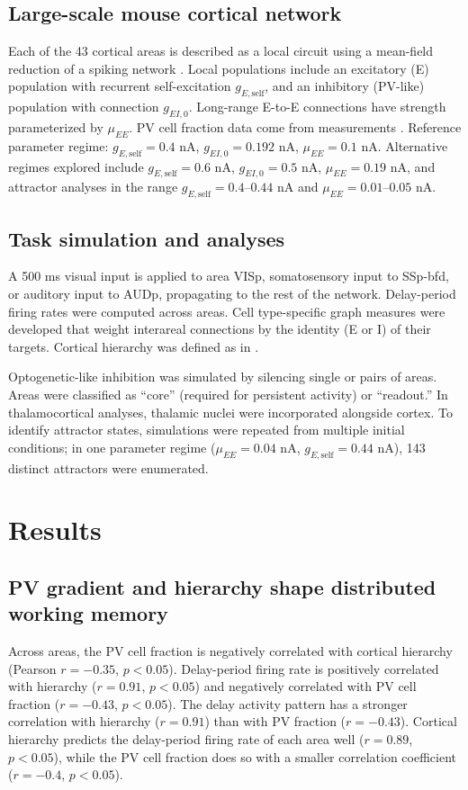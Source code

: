 \documentclass[11pt]{article}
\begin{document}
\subsection{Large-scale mouse cortical network}
Each of the 43 cortical areas is described as a local circuit using a mean-field reduction \cite{wongwang2006} of a spiking network \cite{wang2002probabilistic}. Local populations include an excitatory (E) population with recurrent self-excitation $g_{E,\mathrm{self}}$, and an inhibitory (PV-like) population with connection $g_{EI,0}$. Long-range E-to-E connections have strength parameterized by $\mu_{EE}$. PV cell fraction data come from measurements \cite{kim2017brain,fulcher2019multimodal}. Reference parameter regime: $g_{E,\mathrm{self}} = 0.4$ nA, $g_{EI,0} = 0.192$ nA, $\mu_{EE} = 0.1$ nA. Alternative regimes explored include $g_{E,\mathrm{self}} = 0.6$ nA, $g_{EI,0} = 0.5$ nA, $\mu_{EE} = 0.19$ nA, and attractor analyses in the range $g_{E,\mathrm{self}} = 0.4$--$0.44$ nA and $\mu_{EE} = 0.01$--$0.05$ nA.

\subsection{Task simulation and analyses}
A 500 ms visual input is applied to area VISp, somatosensory input to SSp-bfd, or auditory input to AUDp, propagating to the rest of the network. Delay-period firing rates were computed across areas. Cell type-specific graph measures were developed that weight interareal connections by the identity (E or I) of their targets. Cortical hierarchy was defined as in \cite{harris2019hierarchical}.

Optogenetic-like inhibition was simulated by silencing single or pairs of areas. Areas were classified as ``core'' (required for persistent activity) or ``readout.'' In thalamocortical analyses, thalamic nuclei were incorporated alongside cortex. To identify attractor states, simulations were repeated from multiple initial conditions; in one parameter regime ($\mu_{EE} = 0.04$ nA, $g_{E,\mathrm{self}} = 0.44$ nA), 143 distinct attractors were enumerated.

\section{Results}
\subsection{PV gradient and hierarchy shape distributed working memory}
Across areas, the PV cell fraction is negatively correlated with cortical hierarchy (Pearson $r = -0.35$, $p < 0.05$). Delay-period firing rate is positively correlated with hierarchy ($r = 0.91$, $p < 0.05$) and negatively correlated with PV cell fraction ($r = -0.43$, $p < 0.05$). The delay activity pattern has a stronger correlation with hierarchy ($r = 0.91$) than with PV fraction ($r = -0.43$). Cortical hierarchy predicts the delay-period firing rate of each area well ($r = 0.89$, $p < 0.05$), while the PV cell fraction does so with a smaller correlation coefficient ($r = -0.4$, $p < 0.05$).
\end{document}
